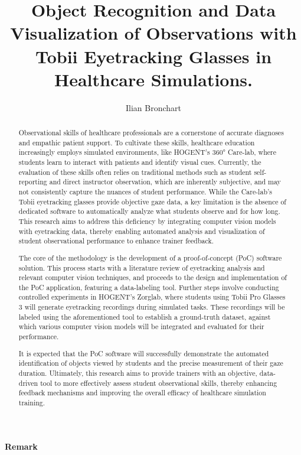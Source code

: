 \documentclass[english]{hogent-article}
\title{Object Recognition and Data Visualization of Observations with Tobii Eyetracking Glasses in Healthcare Simulations.}
\author{Ilian Bronchart}
\begin{document}
\begin{abstract}
Observational skills of healthcare professionals are a cornerstone of accurate diagnoses and empathic patient support. 
To cultivate these skills, healthcare education increasingly employs simulated environments, 
like HOGENT's 360° Care-lab, where students learn to interact with patients and identify visual cues. 
Currently, the evaluation of these skills often relies on traditional methods such as student 
self-reporting and direct instructor observation, which are inherently subjective, and may not 
consistently capture the nuances of student performance. 
While the Care-lab's Tobii eyetracking glasses provide objective gaze data, a key limitation is the absence 
of dedicated software to automatically analyze what students observe and for how long.
This research aims to address this deficiency by integrating computer vision models with eyetracking data, 
thereby enabling automated analysis and visualization of student observational performance to enhance trainer feedback.

The core of the methodology is the development of a proof-of-concept (PoC) software solution. 
This process starts with a literature review of eyetracking analysis and relevant computer vision techniques, 
and proceeds to the design and implementation of the PoC application, featuring a data-labeling tool. 
Further steps involve conducting controlled experiments in HOGENT's Zorglab, 
where students using Tobii Pro Glasses 3 will generate eyetracking recordings during simulated tasks. 
These recordings will be labeled using the aforementioned tool to establish a ground-truth dataset, 
against which various computer vision models will be integrated and evaluated for their 
performance.

It is expected that the PoC software will successfully demonstrate the automated identification 
of objects viewed by students and the precise measurement of their gaze duration. 
Ultimately, this research aims to provide trainers with an objective, data-driven tool to more effectively assess 
student observational skills, thereby enhancing feedback mechanisms and improving the overall efficacy of healthcare simulation training.
\end{abstract}

\tableofcontents

\bigskip

\paragraph{Remark}
\end{document}
